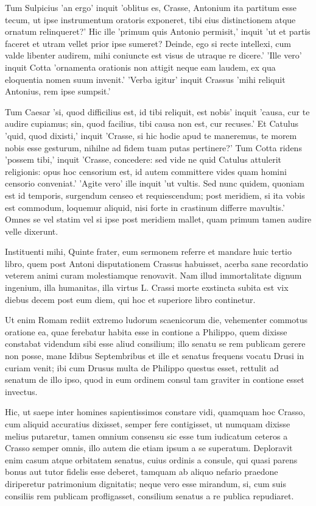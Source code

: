  Tum Sulpicius 'an ergo' inquit 'oblitus es, Crasse, Antonium ita partitum esse tecum, ut ipse instrumentum oratoris exponeret, tibi eius distinctionem atque ornatum relinqueret?' Hic ille 'primum quis Antonio permisit,' inquit 'ut et partis faceret et utram vellet prior ipse sumeret? Deinde, ego si recte intellexi, cum valde libenter audirem, mihi coniuncte est visus de utraque re dicere.' 'Ille vero' inquit Cotta 'ornamenta orationis non attigit neque eam laudem, ex qua eloquentia nomen suum invenit.' 'Verba igitur' inquit Crassus 'mihi reliquit Antonius, rem ipse sumpsit.'

 Tum Caesar 'si, quod difficilius est, id tibi reliquit, est nobis' inquit 'causa, cur te audire cupiamus; sin, quod facilius, tibi causa non est, cur recuses.' Et Catulus 'quid, quod dixisti,' inquit 'Crasse, si hic hodie apud te maneremus, te morem nobis esse gesturum, nihilne ad fidem tuam putas pertinere?' Tum Cotta ridens 'possem tibi,' inquit 'Crasse, concedere: sed vide ne quid Catulus attulerit religionis: opus hoc censorium est, id autem committere vides quam homini censorio conveniat.' 'Agite vero' ille inquit 'ut vultis. Sed nunc quidem, quoniam est id temporis, surgendum censeo et requiescendum; post meridiem, si ita vobis est commodum, loquemur aliquid, nisi forte in crastinum differre mavultis.' Omnes se vel statim vel si ipse post meridiem mallet, quam primum tamen audire velle dixerunt.

 Instituenti mihi, Quinte frater, eum sermonem referre et mandare huic tertio libro, quem post Antoni disputationem Crassus habuisset, acerba sane recordatio veterem animi curam molestiamque renovavit. Nam illud immortalitate dignum ingenium, illa humanitas, illa virtus L. Crassi morte exstincta subita est vix diebus decem post eum diem, qui hoc et superiore libro continetur.

 Ut enim Romam rediit extremo ludorum scaenicorum die, vehementer commotus oratione ea, quae ferebatur habita esse in contione a Philippo, quem dixisse constabat videndum sibi esse aliud consilium; illo senatu se rem publicam gerere non posse, mane Idibus Septembribus et ille et senatus frequens vocatu Drusi in curiam venit; ibi cum Drusus multa de Philippo questus esset, rettulit ad senatum de illo ipso, quod in eum ordinem consul tam graviter in contione esset invectus.

 Hic, ut saepe inter homines sapientissimos constare vidi, quamquam hoc Crasso, cum aliquid accuratius dixisset, semper fere contigisset, ut numquam dixisse melius putaretur, tamen omnium consensu sic esse tum iudicatum ceteros a Crasso semper omnis, illo autem die etiam ipsum a se superatum. Deploravit enim casum atque orbitatem senatus, cuius ordinis a consule, qui quasi parens bonus aut tutor fidelis esse deberet, tamquam ab aliquo nefario praedone diriperetur patrimonium dignitatis; neque vero esse mirandum, si, cum suis consiliis rem publicam profligasset, consilium senatus a re publica repudiaret.

